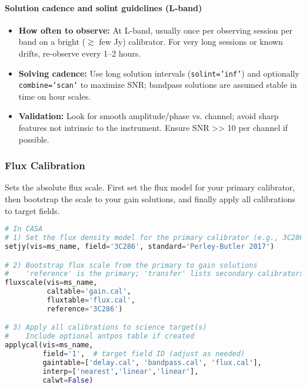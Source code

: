 \documentclass[11pt]{article}
\begin{document}
\paragraph{Solution cadence and solint guidelines (L-band)}
\begin{itemize}
    \item \textbf{How often to observe:} At L-band, usually once per observing session per band on a bright (\(\gtrsim\) few Jy) calibrator. For very long sessions or known drifts, re-observe every 1--2 hours.
    \item \textbf{Solving cadence:} Use long solution intervals (\texttt{solint='inf'}) and optionally \texttt{combine='scan'} to maximize SNR; bandpass solutions are assumed stable in time on hour scales.
    \item \textbf{Validation:} Look for smooth amplitude/phase vs. channel; avoid sharp features not intrinsic to the instrument. Ensure SNR >> 10 per channel if possible.
\end{itemize}

\subsubsection{Flux Calibration}
Sets the absolute flux scale. First set the flux model for your primary calibrator, then bootstrap the scale to your gain solutions, and finally apply all calibrations to target fields.

\begin{lstlisting}[language=Python]
# In CASA
# 1) Set the flux density model for the primary calibrator (e.g., 3C286)
setjy(vis=ms_name, field='3C286', standard='Perley-Butler 2017')

# 2) Bootstrap flux scale from the primary to gain solutions
#    'reference' is the primary; 'transfer' lists secondary calibrators (if any)
fluxscale(vis=ms_name,
          caltable='gain.cal',
          fluxtable='flux.cal',
          reference='3C286')

# 3) Apply all calibrations to science target(s)
#    Include optional antpos table if created
applycal(vis=ms_name,
         field='1',  # target field ID (adjust as needed)
         gaintable=['delay.cal', 'bandpass.cal', 'flux.cal'],
         interp=['nearest','linear','linear'],
         calwt=False)
\end{lstlisting}
\end{document}
